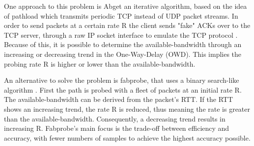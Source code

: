 \documentclass[NET,a4,12pt,english]{netforms}
\begin{document}
One approach to this problem is Abget an iterative algorithm, based on the idea of pathload which transmits periodic TCP instead of UDP packet streams. In order to send packets at a certain rate R the client sends "fake" ACKs over to the TCP server, through a raw IP socket interface to emulate the TCP protocol \cite{proceedings:passivactivemeas} .
Because of this, it is possible to determine the available-bandwidth through an increasing or decreasing trend in the One-Way-Delay (OWD). This implies the probing rate R is higher or lower than the available-bandwidth.

An alternative to solve the problem is fabprobe, that uses a binary search-like algorithm \cite{fabprobe}. %
First the path is probed with a fleet of packets at an initial rate R. The available-bandwidth can be derived from the packet's RTT. If the RTT shows an increasing trend, the rate R is reduced, thus meaning the rate is greater than the available-bandwidth. Consequently, a decreasing trend results in increasing R. Fabprobe's main focus is the trade-off between efficiency and accuracy, with fewer numbers of samples to achieve the highest accuracy possible.
\end{document}
